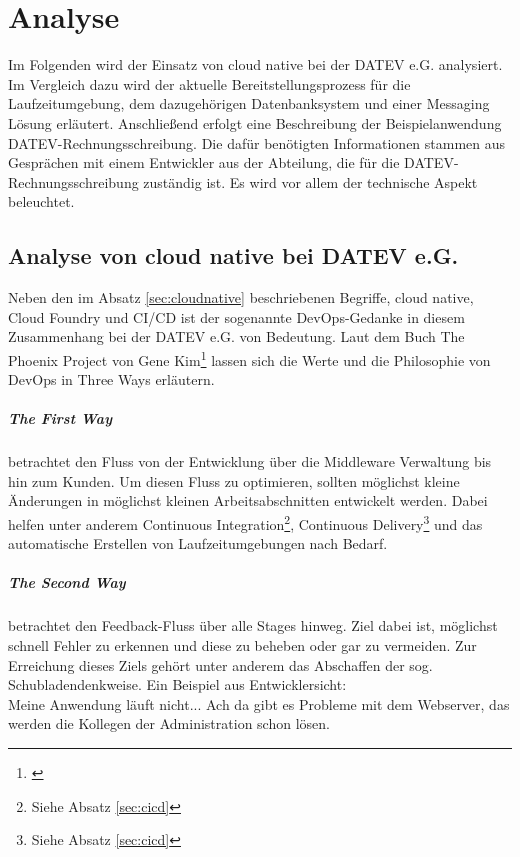 \chapter{Analyse}\label{ch:analyse}
Im Folgenden wird der Einsatz von cloud native bei der DATEV e.G. analysiert.
Im Vergleich dazu wird der aktuelle Bereitstellungsprozess für die Laufzeitumgebung, dem dazugehörigen Datenbanksystem und einer Messaging Lösung erläutert.
Anschließend erfolgt eine Beschreibung der Beispielanwendung \glqq DATEV-Rechnungsschreibung\grqq.
Die dafür benötigten Informationen stammen aus Gesprächen mit einem Entwickler aus der Abteilung, die für die DATEV-Rechnungsschreibung zuständig ist.
Es wird vor allem der technische Aspekt beleuchtet.

\section{Analyse von cloud native bei DATEV e.G.}\label{sec:analysecloud}
Neben den im Absatz \ref{sec:cloudnative} beschriebenen Begriffe, \glqq cloud native\grqq, \glqq Cloud Foundry\grqq{} und \glqq CI/CD\grqq{} ist der sogenannte \glqq DevOps\grqq-Gedanke in diesem Zusammenhang bei der DATEV e.G. von Bedeutung.
Laut dem Buch \glqq The Phoenix Project\grqq{} von Gene Kim\footnote{\cite[Kap. \glqq The Three Ways Explained\grqq]{Kim.2014}} lassen sich die Werte und die Philosophie von DevOps in \glqq Three Ways\grqq{} erläutern.

\paragraph{\glqq The First Way\grqq} betrachtet den Fluss von der Entwicklung über die Middleware Verwaltung bis hin zum Kunden.
Um diesen Fluss zu optimieren, sollten möglichst kleine Änderungen in möglichst kleinen Arbeitsabschnitten entwickelt werden.
Dabei helfen unter anderem Continuous Integration\footnote{Siehe Absatz \ref{sec:cicd}}, Continuous Delivery\footnote{Siehe Absatz \ref{sec:cicd}} und das automatische Erstellen von Laufzeitumgebungen nach Bedarf.

\paragraph{\glqq The Second Way\grqq} betrachtet den Feedback-Fluss über alle Stages hinweg.
Ziel dabei ist, möglichst schnell Fehler zu erkennen und diese zu beheben oder gar zu vermeiden.
Zur Erreichung dieses Ziels gehört unter anderem das Abschaffen der sog. \glqq Schubladendenkweise\grqq.
Ein Beispiel aus Entwicklersicht:\\
\glqq Meine Anwendung läuft nicht... Ach da gibt es Probleme mit dem Webserver, das werden die Kollegen der Administration schon lösen\grqq.

